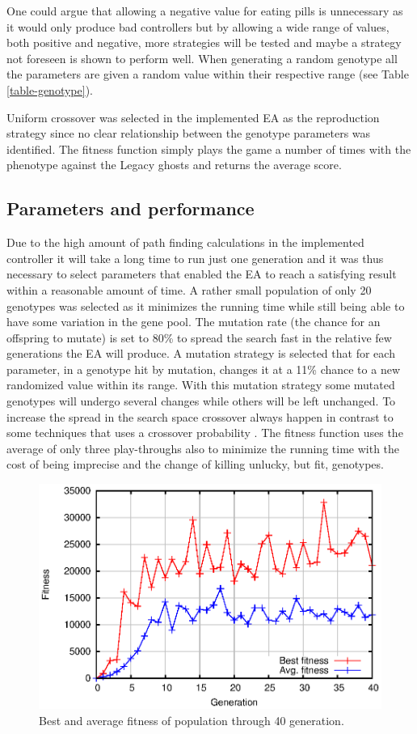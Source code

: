 \documentclass[conference]{IEEEtran}
\begin{document}
One could argue that allowing a negative value for eating pills is unnecessary as it would only produce bad controllers but by allowing a wide range of values, both positive and negative, more strategies will be tested and maybe a strategy not foreseen is shown to perform well. When generating a random genotype all the parameters are given a random value within their respective range (see Table \ref{table-genotype}).

Uniform crossover was selected in the implemented EA as the reproduction strategy since no clear relationship between the genotype parameters was identified. The fitness function simply plays the game a number of times with the phenotype against the Legacy ghosts and returns the average score. 

\subsection{Parameters and performance}
Due to the high amount of path finding calculations in the implemented controller it will take a long time to run just one generation and it was thus necessary to select parameters that enabled the EA to reach a satisfying result within a reasonable amount of time. A rather small population of only 20 genotypes was selected as it minimizes the running time while still being able to have some variation in the gene pool. The mutation rate (the chance for an offspring to mutate) is set to 80\% to spread the search fast in the relative few generations the EA will produce. A mutation strategy is selected that for each parameter, in a genotype hit by mutation, changes it at a 11\% chance to a new randomized value within its range. With this mutation strategy some mutated genotypes will undergo several changes while others will be left unchanged. To increase the spread in the search space crossover always happen in contrast to some techniques that uses a crossover probability \cite{GAsurvey}. The fitness function uses the average of only three play-throughs also to minimize the running time with the cost of being imprecise and the change of killing unlucky, but fit, genotypes. 

\begin{figure}[!htb]
\centering
\includegraphics[scale=.7]{ga.eps}
\caption{Best and average fitness of population through 40 generation.}
\label{fig:EABF}
\end{figure}
\end{document}
